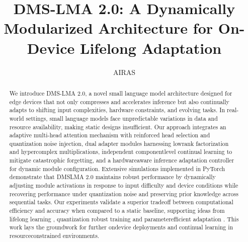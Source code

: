 \documentclass{article} %
\title{DMS-LMA 2.0: A Dynamically Modularized Architecture for On-Device Lifelong Adaptation}
\author{AIRAS}
\begin{document}
\maketitle

\begin{abstract}
We introduce DMS-LMA 2.0, a novel small language model architecture designed for edge devices that not only compresses and accelerates inference but also continually adapts to shifting input complexities, hardware constraints, and evolving tasks. In real-world settings, small language models face unpredictable variations in data and resource availability, making static designs insufficient. Our approach integrates an adaptive multi-head attention mechanism with reinforced head selection and quantization noise injection, dual adapter modules harnessing low\-rank factorization and hypercomplex multiplications, independent component\-level continual learning to mitigate catastrophic forgetting, and a hardware\-aware inference adaptation controller for dynamic module configuration. Extensive simulations implemented in PyTorch demonstrate that DMS\-LMA 2.0 maintains robust performance by dynamically adjusting module activations in response to input difficulty and device conditions while recovering performance under quantization noise and preserving prior knowledge across sequential tasks. Our experiments validate a superior trade\-off between computational efficiency and accuracy when compared to a static baseline, supporting ideas from lifelong learning \cite{sun2019lamol, chaudhry2018lifelong}, quantization robust training \cite{fan2020training} and parameter\-efficient adaptation \cite{mahabadi2021compacter}. This work lays the groundwork for further on\-device deployments and continual learning in resource\-constrained environments.
\end{abstract}
\end{document}
